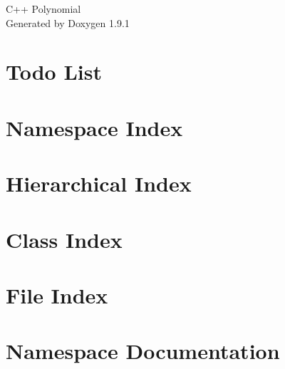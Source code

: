 \let\mypdfximage\pdfximage\def\pdfximage{\immediate\mypdfximage}\documentclass[twoside]{book}
\newcommand{\+}{\discretionary{\mbox{\scriptsize$\hookleftarrow$}}{}{}}
\newcommand{\clearemptydoublepage}{%
  \newpage{\pagestyle{empty}\cleardoublepage}%
}
\begin{document}
\raggedbottom

\hypersetup{pageanchor=false,
             bookmarksnumbered=true,
             pdfencoding=unicode
            }
\begin{titlepage}
\vspace*{7cm}
\begin{center}%
{\Large C++ Polynomial }\\
\vspace*{1cm}
{\large Generated by Doxygen 1.9.1}\\
\end{center}
\end{titlepage}
\clearemptydoublepage
{}
\tableofcontents
\clearemptydoublepage
{}
\hypersetup{pageanchor=true}

\chapter{Todo List}
\label{todo}

\chapter{Namespace Index}

\chapter{Hierarchical Index}

\chapter{Class Index}

\chapter{File Index}

\chapter{Namespace Documentation}

\end{document}
